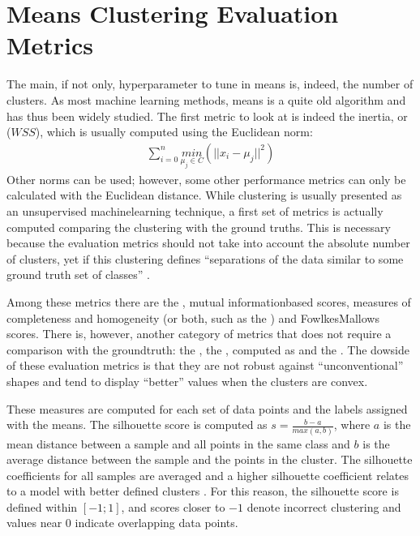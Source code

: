 \documentclass[letterpaper,10pt,english]{jupyterBook}
\begin{document}
\section{\sphinxhyphen{}Means Clustering Evaluation Metrics}
\label{\detokenize{04-stations_kmeans:k-means-clustering-evaluation-metrics}}
\sphinxAtStartPar
The main, if not only, hyperparameter to tune in \sphinxhyphen{}means is, indeed, the number of clusters.
As most machine learning methods, \sphinxhyphen{}means is a quite old algorithm and has thus been widely studied.
The first metric to look at is indeed the inertia, or  (\(WSS\)), which is usually computed using the Euclidean norm:
\begin{equation*}
\begin{split}
\sum_{i=0}^{n}\underset{\mu_{j}\in{C}}{min}(||x_{i} - \mu_{j}||^2)
\end{split}
\end{equation*}
\sphinxAtStartPar
Other norms can be used; however, some other performance metrics can only be calculated with the Euclidean distance. While clustering is usually presented as an unsupervised machine\sphinxhyphen{}learning technique, a first set of metrics is actually computed comparing the clustering with the ground truths. This is necessary because the evaluation metrics should not take into account the absolute number of clusters, yet if this clustering defines “separations of the data similar to some ground truth set of classes” .

\sphinxAtStartPar
Among these metrics there are the , mutual information\sphinxhyphen{}based scores, measures of completeness and homogeneity (or both, such as the ) and Fowlkes\sphinxhyphen{}Mallows scores. There is, however, another category of metrics that does not require a comparison with the ground\sphinxhyphen{}truth: the , the , computed as  and  the . The dowside of these evaluation metrics is that they are not robust against “unconventional” shapes and tend to display “better” values when the clusters are convex.

\sphinxAtStartPar
These measures are computed for each set of data points and the labels assigned with the \sphinxhyphen{}means. The silhouette score is computed as \(s = \frac{b - a}{max(a, b)}\), where \(a\) is the mean distance between a sample and all points in the same class and \(b\) is the average distance between the sample and the points in the  cluster. The silhouette coefficients for all samples are averaged and a higher silhouette coefficient relates to a model with better defined clusters . For this reason, the silhouette score is defined within \([-1;1]\), and scores closer to \(-1\) denote incorrect clustering and values near \(0\) indicate overlapping data points.
\end{document}
